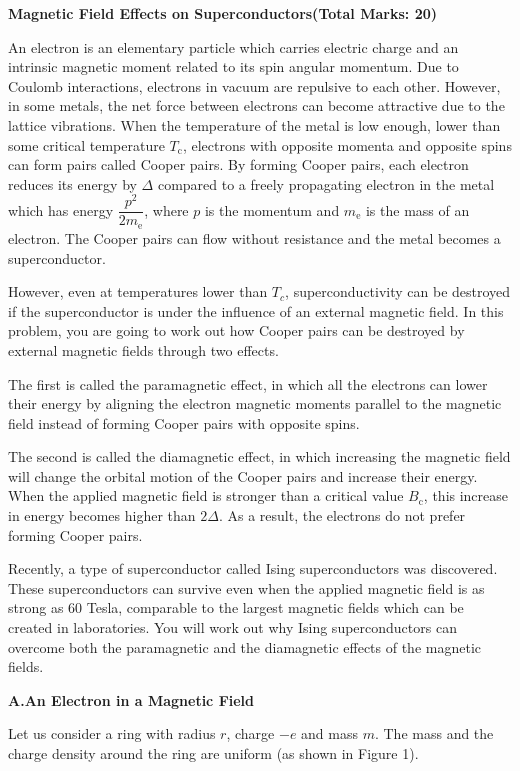 {\large\textbf{Magnetic Field Effects on Superconductors}\hfill\textbf{(Total Marks: 20)}}

An electron is an elementary particle which carries electric charge and an intrinsic magnetic moment related to its spin angular momentum. Due to Coulomb interactions, electrons in vacuum are repulsive to each other. However, in some metals, the net force between electrons can become attractive due to the lattice vibrations. When the temperature of the metal is low enough, lower than some critical temperature $T_\mathrm{c}$, electrons with opposite momenta and opposite spins can form pairs called Cooper pairs. By forming Cooper pairs, each electron reduces its energy by $\Delta$ compared to a freely propagating electron in the metal which has energy $\dfrac{p^2}{2m_\mathrm{e}}$, where $p$ is the momentum and $m_\mathrm{e}$ is the mass of an electron. The Cooper pairs can flow without resistance and the metal becomes a superconductor.

However, even at temperatures lower than $T_c$, superconductivity can be destroyed if the superconductor is under the influence of an external magnetic field. In this problem, you are going to work out how Cooper pairs can be destroyed by external magnetic fields through two effects.

The first is called the paramagnetic effect, in which all the electrons can lower their energy by aligning the electron magnetic moments parallel to the magnetic field instead of forming Cooper pairs with opposite spins.

The second is called the diamagnetic effect, in which increasing the magnetic field will change the orbital motion of the Cooper pairs and increase their energy. When the applied magnetic field is stronger than a critical value $B_\mathrm{c}$, this increase in energy becomes higher than $2\Delta$. As a result, the electrons do not prefer forming Cooper pairs.

Recently, a type of superconductor called Ising superconductors was discovered. These superconductors can survive even when the applied magnetic field is as strong as 60 Tesla, comparable to the largest magnetic fields which can be created in laboratories. You will work out why Ising superconductors can overcome both the paramagnetic and the diamagnetic effects of the magnetic fields.

\textbf{A.\quad An Electron in a Magnetic Field}

Let us consider a ring with radius $r$, charge $-e$ and mass $m$. The mass and the charge density around the ring are uniform (as shown in Figure 1).

